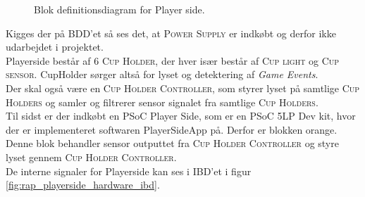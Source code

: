 \documentclass[Rapport/Rapport_main.tex]{subfiles}
\begin{document}
\begin{figure}[H]
    \centering
    \caption{Blok definitionsdiagram for Player side.}
    \label{fig:rap_playerside_hardware_bdd}
\end{figure}
Kigges der på BDD'et så ses det, at \textsc{Power Supply} er indkøbt og derfor ikke udarbejdet i projektet.\\
Playerside består af 6 \textsc{Cup Holder}, der hver især består af \textsc{Cup light} og \textsc{Cup sensor}. CupHolder sørger altså for lyset og detektering af \textit{Game Events}.\\ 
Der skal også være en \textsc{Cup Holder Controller}, som styrer lyset på samtlige \textsc{Cup Holders} og samler og filtrerer sensor signalet fra samtlige \textsc{Cup Holders}. \\ 
Til sidst er der indkøbt en PSoC Player Side, som er en PSoC 5LP Dev kit, hvor der er implementeret softwaren PlayerSideApp på. Derfor er blokken orange. Denne blok behandler sensor outputtet fra \textsc{Cup Holder Controller} og styre lyset gennem \textsc{Cup Holder Controller}.\\
De interne signaler for Playerside kan ses i IBD'et i figur \ref{fig:rap_playerside_hardware_ibd}.
\end{document}

